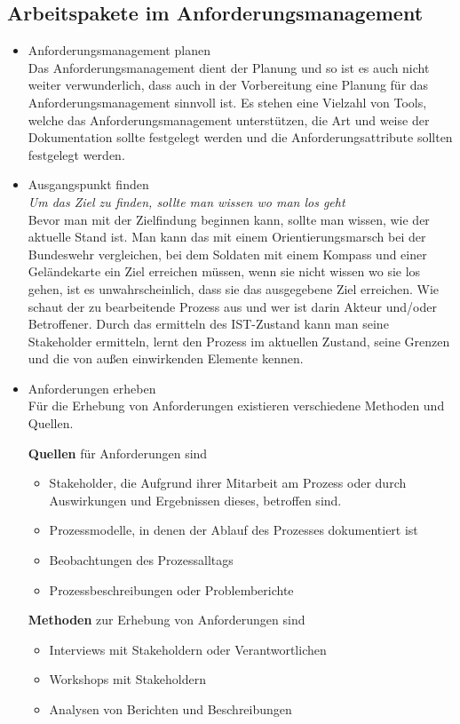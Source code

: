 \subsection{Arbeitspakete im Anforderungsmanagement}
\begin{itemize}
\item Anforderungsmanagement planen \\
		Das Anforderungsmanagement dient der Planung und so ist es auch nicht weiter
		verwunderlich, dass auch in der Vorbereitung eine Planung für das Anforderungsmanagement
		sinnvoll ist. Es stehen eine Vielzahl von Tools, welche das Anforderungsmanagement
		unterstützen, die Art und weise der Dokumentation sollte festgelegt werden und die
		Anforderungsattribute sollten festgelegt werden.

\item Ausgangspunkt finden \\
		\textit{Um das Ziel zu finden, sollte man wissen wo man los geht} \\
		Bevor man mit der Zielfindung beginnen kann, sollte man wissen, wie der aktuelle Stand 
		ist. Man kann das mit einem Orientierungsmarsch bei der Bundeswehr vergleichen, bei dem 
		Soldaten mit einem Kompass und einer Geländekarte ein Ziel erreichen müssen, wenn sie 
		nicht wissen wo sie los gehen, ist es unwahrscheinlich, dass sie das ausgegebene Ziel 
		erreichen. Wie schaut der zu bearbeitende Prozess aus und wer ist darin Akteur und/oder 
		Betroffener. Durch das ermitteln des IST-Zustand kann man seine Stakeholder ermitteln, 
		lernt den Prozess im aktuellen Zustand, seine Grenzen und die von außen einwirkenden 
		Elemente kennen. 

\item Anforderungen erheben\\
		Für die Erhebung von Anforderungen existieren verschiedene Methoden und Quellen. 
		
		\textbf{Quellen} für Anforderungen sind 
		\begin{itemize}
		\itemsep-8pt
		\item Stakeholder, die Aufgrund ihrer Mitarbeit am Prozess oder durch Auswirkungen und 
		Ergebnissen dieses, betroffen sind.
		\item Prozessmodelle, in denen der Ablauf des Prozesses dokumentiert ist
		\item Beobachtungen des Prozessalltags
		\item Prozessbeschreibungen oder Problemberichte
		\end{itemize}		
		\textbf{Methoden} zur Erhebung von Anforderungen sind
		\begin{itemize}
		\itemsep-8pt
		\item Interviews mit Stakeholdern oder Verantwortlichen
		\item Workshops mit Stakeholdern 
		\item Analysen von Berichten und Beschreibungen
		\end{itemize}
		

\end{itemize}
